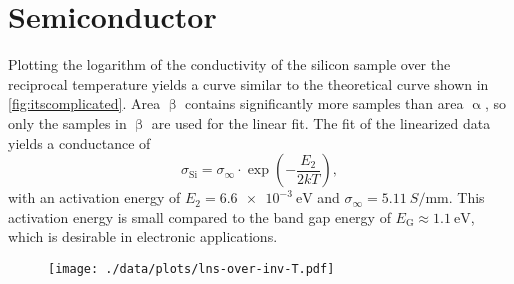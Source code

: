 \section{Semiconductor}
Plotting the logarithm of the conductivity of the silicon sample over the reciprocal temperature yields a curve similar to the theoretical curve shown in \autoref{fig:itscomplicated}.
Area $\upbeta$ contains significantly more samples than area $\upalpha$, so only the samples in $\upbeta$ are used for the linear fit.
The fit of the linearized data yields a conductance of
\begin{equation*}
	\sigma_\text{Si} = \sigma_\infty \cdot \exp\left(- \frac{E_2}{2 k T}\right),
\end{equation*}
with an activation energy of $E_2 = \SI{6.6e-3}{\eV}$ and $\sigma_\infty = \SI{5.11}{S\per\milli\meter}$.
This activation energy is small compared to the band gap energy of $E_\text{G} \approx \SI{1.1}{\eV}$, which is desirable in electronic applications.

\begin{figure}
	\centering
	\texttt{[image: ./data/plots/lns-over-inv-T.pdf]}
	\label{fig:lns-over-inv-T}
\end{figure}
